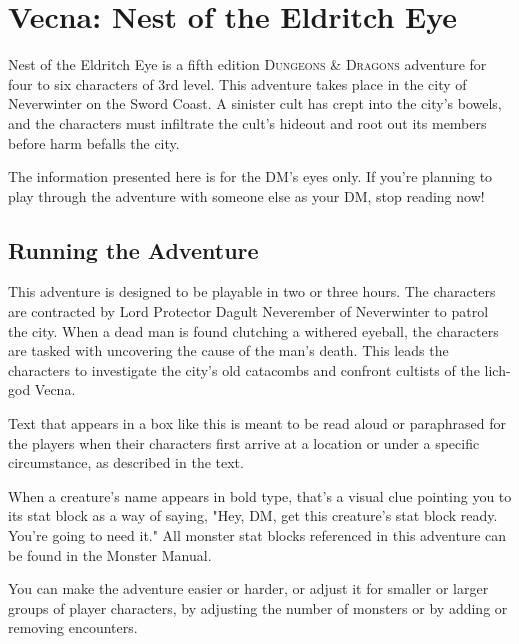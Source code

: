 \documentclass[10pt,a4paper,twoside,bg=print,twocolumn,openany,nodeprecatedcode]{dndbook}
\begin{document}
\frontmatter
\rpgMakeCover[
    image = images/adventure/VNotEE/000-00-001.something-wicked-approaches.png,
    title = Vecna: Nest of the Eldritch Eye,
    subtitle = An offsite backup of the preview adventure just for Ben.,
]

\mainmatter


\chapter*{Vecna: Nest of the Eldritch Eye}
 Nest of the Eldritch Eye is a fifth edition \textsc{Dungeons \& Dragons} adventure for four to six characters of 3rd level. This adventure takes place in the city of Neverwinter on the Sword Coast. A sinister cult has crept into the city's bowels, and the characters must infiltrate the cult's hideout and root out its members before harm befalls the city.

The information presented here is for the DM's eyes only. If you're planning to play through the adventure with someone else as your DM, stop reading now!


\section{Running the Adventure}
This adventure is designed to be playable in two or three hours. The characters are contracted by Lord Protector Dagult Neverember of Neverwinter to patrol the city. When a dead man is found clutching a withered eyeball, the characters are tasked with uncovering the cause of the man's death. This leads the characters to investigate the city's old catacombs and confront cultists of the lich-god Vecna.
\begin{DndReadAloud}{}
Text that appears in a box like this is meant to be read aloud or paraphrased for the players when their characters first arrive at a location or under a specific circumstance, as described in the text.
\end{DndReadAloud}

When a creature's name appears in bold type, that's a visual clue pointing you to its stat block as a way of saying, "Hey, DM, get this creature's stat block ready. You're going to need it." All monster stat blocks referenced in this adventure can be found in the Monster Manual.

You can make the adventure easier or harder, or adjust it for smaller or larger groups of player characters, by adjusting the number of monsters or by adding or removing encounters.
\end{document}
